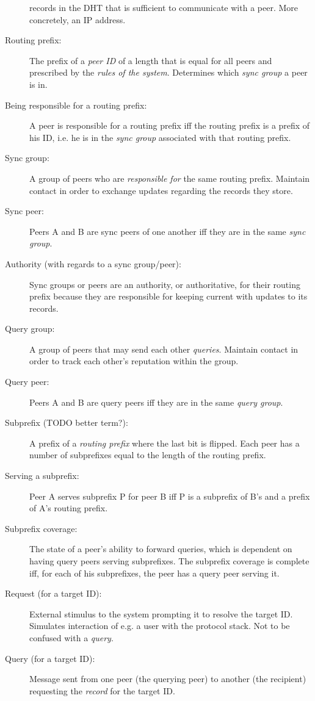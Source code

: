\begin{description}
records in the \ac{DHT} that is sufficient to communicate with a peer. More
concretely, an IP address.
\item[Routing prefix:] The prefix of a \emph{peer ID} of a length that is equal
for all peers and prescribed by the \emph{rules of the system}. Determines which
\emph{sync group} a peer is in.
\item[Being responsible for a routing prefix:] A peer is responsible for a
routing prefix iff the routing prefix is a prefix of his ID, i.e. he is in the
\emph{sync group} associated with that routing prefix.
\item[Sync group:] A group of peers who are \emph{responsible for} the same
routing prefix. Maintain contact in order to exchange updates regarding the
records they store.
\item[Sync peer:] Peers A and B are sync peers of one another iff they are in
the same \emph{sync group}.
\item[Authority (with regards to a sync group/peer):] Sync groups or peers are
an authority, or authoritative, for their routing prefix because they are
responsible for keeping current with updates to its records.
\item[Query group:] A group of peers that may send each other \emph{queries}.
Maintain contact in order to track each other's reputation within the group.
\item[Query peer:] Peers A and B are query peers iff they are in the same
\emph{query group}.
\item[Subprefix (TODO better term?):] A prefix of a \emph{routing prefix} where
the last bit is flipped. Each peer has a number of subprefixes equal to the
length of the routing prefix.
\item[Serving a subprefix:] Peer A serves subprefix P for peer B iff P is a
subprefix of B's and a prefix of A's routing prefix.
\item[Subprefix coverage:] The state of a peer's ability to forward queries,
which is dependent on having query peers serving subprefixes. The subprefix
coverage is complete iff, for each of his subprefixes, the peer has a query peer
serving it.
\item[Request (for a target ID):] External stimulus to the system prompting it
to resolve the target ID. Simulates interaction of e.g. a user with the protocol
stack. Not to be confused with a \emph{query}.
\item[Query (for a target ID):] Message sent from one peer (the querying peer)
to another (the recipient) requesting the \emph{record} for the target ID.

\end{description}
